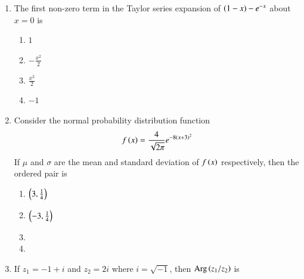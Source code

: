 \documentclass[journal,12pt,onecolumn]{IEEEtran}
\theoremstyle{remark}
\begin{document}
\begin{enumerate}
	
	
		\item The first non-zero term in the Taylor series expansion of $\left(1-x\right)-e^{-x}$ about $x=0$ is
		
		\hfill{}
		\begin{enumerate}
			\item $1$
			\item $-\frac{x^2}{2}$
			\item $\frac{x^2}{2}$
			\item $-1$
		\end{enumerate}
		
		\item Consider the normal probability distribution function
		$$ f\left(x\right) = \frac{4}{\sqrt{2\pi}} e^{-8\left(x+3\right)^2} $$
		If $\mu$ and $\sigma$ are the mean and standard deviation of $f\left(x\right)$ respectively, then the ordered pair \brak{\mu, \sigma} is
		
		\hfill{}
		\begin{enumerate}
			\item $\left(3, \frac{1}{4}\right)$
			\item $\left(-3, \frac{1}{4}\right)$
			\item {}
			\item {}
		\end{enumerate}
		
		\item If $z_1 = -1+i$ and $z_2 = 2i$ where $i = \sqrt{-1}$, then $\text{Arg}\left(z_1/z_2\right)$ is
		
		\hfill{}
		\begin{enumerate}
		\end{enumerate}
		

\end{enumerate}
\end{document}
